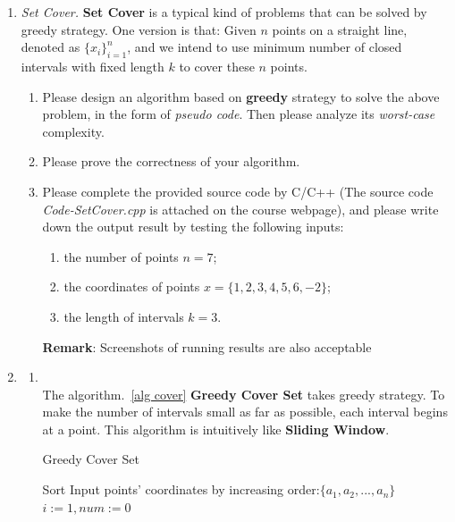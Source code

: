 \documentclass[12pt,a4paper]{article}
\makeatletter
\newtheorem*{solution}{Solution}
\theoremstyle{definition}
\renewenvironment{solution}[1][Solution] {\par\pushQED{\qed}\normalfont\topsep6\p@\@plus6\p@\relax\trivlist\item[\hskip\labelsep\bfseries#1\@addpunct{.}]\ignorespaces}{\popQED\endtrivlist\@endpefalse} \makeatother
\makeatother
\begin{document}
\begin{enumerate}
    \item \textit{Set Cover.} \textbf{Set Cover} is a typical kind of problems that can be solved by greedy strategy. One version is that: Given $n$ points on a straight line, denoted as $\{x_i\}_{i=1}^n$, and we intend to use minimum number of closed intervals with fixed length $k$ to cover these $n$ points.
    \begin{enumerate}
    	\item Please design an algorithm based on \textbf{greedy} strategy to solve the above problem, in the form of \emph{pseudo code}. Then please analyze its \emph{worst-case} complexity.
    	\item Please prove the correctness of your algorithm.
    	\item Please complete the provided source code by C/C++ {\color{blue}(The source code \emph{Code-SetCover.cpp} is attached on the course webpage)}, and please write down the output result by testing the following inputs: 
    	\begin{enumerate}
    		\item the number of points $n=7$;
    		\item the coordinates of points
    		$x=\{1,2,3,4,5,6,-2\}$;
    		\item the length of intervals
    		$k=3$.
    	\end{enumerate}
        \textbf{Remark}: Screenshots of running results are also acceptable 
    \end{enumerate}
    
   \begin{solution}
   
\begin{enumerate}
\item
~\\
The algorithm.~\ref{alg cover} \textbf{Greedy Cover Set} takes greedy strategy. To make the number of intervals small as far as possible, each interval begins at a point. This algorithm is intuitively like \textbf{Sliding Window}.

\begin{algorithm}[H]
   \caption{Greedy Cover Set}\label{alg cover}
		Sort Input points' coordinates by increasing order:$\{a_1, a_2,...,a_n\}$\;
		$i:=1, num:=0$\;
	\end{algorithm}
~\\


\end{enumerate}
\end{solution}
\end{enumerate}
\end{document}
